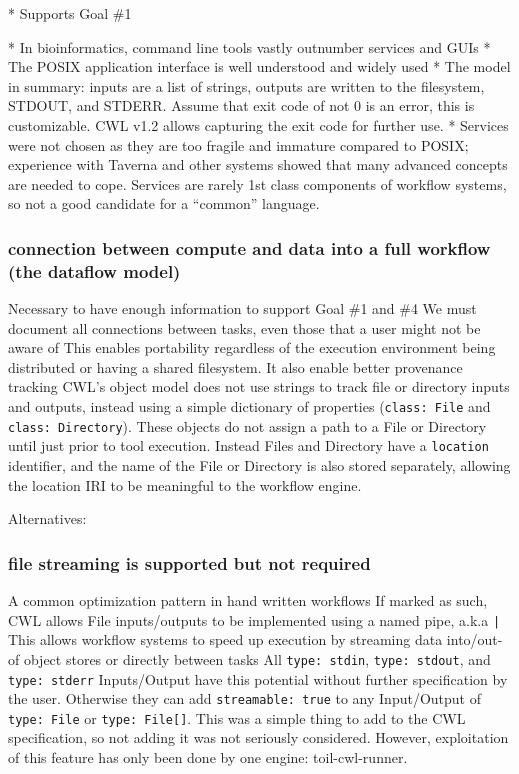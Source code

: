 * Supports Goal \#1

* In bioinformatics, command line tools vastly outnumber services and GUIs
* The POSIX application interface is well understood and widely used
* The model in summary: inputs are a list of strings, outputs are written to the filesystem, STDOUT, and STDERR. Assume that exit code of not 0 is an error, this is customizable. CWL v1.2 allows capturing the exit code for further use.
* Services were not chosen as they are too fragile and immature compared to POSIX; experience with Taverna and other systems showed that many advanced concepts are needed to cope. Services are rarely 1st class components of workflow systems, so not a good candidate for a “common” language.

\subsubsection{connection between compute and data into a full workflow (the dataflow model)}
Necessary to have enough information to support Goal \#1 and \#4
We must document all connections between tasks, even those that a user might not be aware of
This enables portability regardless of the execution environment being  distributed or having a shared filesystem. It also enable better provenance tracking
CWL’s object model does not use strings to track file or directory inputs and outputs, instead using a simple dictionary of properties (\verb|class: File| and \verb|class: Directory|). These objects do not assign a path to a File or Directory until just prior to tool execution. Instead Files and Directory have a \verb|location| identifier, and the name of the File or Directory is also stored separately, allowing the location IRI to be meaningful to the workflow engine.

Alternatives:

\subsubsection{file streaming is supported but not required}
A common optimization pattern in hand written workflows
If marked as such, CWL allows File inputs/outputs to be implemented using a named pipe, a.k.a \verb=|=
This allows workflow systems to speed up execution by streaming data into/out-of object stores or directly between tasks
All \verb|type: stdin|, \verb|type: stdout|, and \verb|type: stderr| Inputs/Output have this potential without further specification by the user. Otherwise they can add \verb|streamable: true| to any Input/Output of \verb|type: File| or \verb|type: File[]|.
This was a simple thing to add to the CWL specification, so not adding it was not seriously considered. However, exploitation of this feature has only been done by one engine: toil-cwl-runner.

